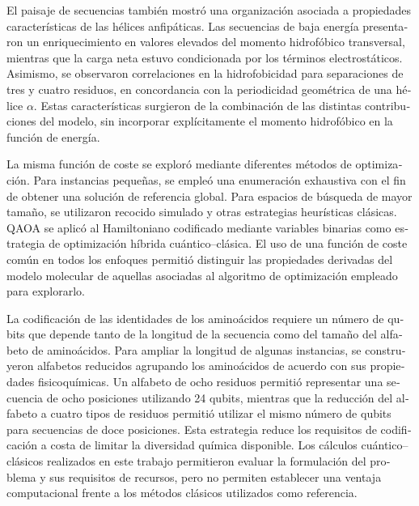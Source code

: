 \begin{otherlanguage}{spanish}
El paisaje de secuencias también mostró una organización asociada a propiedades características de las hélices anfipáticas. Las secuencias de baja energía presentaron un enriquecimiento en valores elevados del momento hidrofóbico transversal, mientras que la carga neta estuvo condicionada por los términos electrostáticos. Asimismo, se observaron correlaciones en la hidrofobicidad para separaciones de tres y cuatro residuos, en concordancia con la periodicidad geométrica de una hélice $\alpha$. Estas características surgieron de la combinación de las distintas contribuciones del modelo, sin incorporar explícitamente el momento hidrofóbico en la función de energía.

La misma función de coste se exploró mediante diferentes métodos de optimización. Para instancias pequeñas, se empleó una enumeración exhaustiva con el fin de obtener una solución de referencia global. Para espacios de búsqueda de mayor tamaño, se utilizaron recocido simulado y otras estrategias heurísticas clásicas. QAOA se aplicó al Hamiltoniano codificado mediante variables binarias como estrategia de optimización híbrida cuántico--clásica. El uso de una función de coste común en todos los enfoques permitió distinguir las propiedades derivadas del modelo molecular de aquellas asociadas al algoritmo de optimización empleado para explorarlo.


La codificación de las identidades de los aminoácidos requiere un número de qubits que depende tanto de la longitud de la secuencia como del tamaño del alfabeto de aminoácidos. Para ampliar la longitud de algunas instancias, se construyeron alfabetos reducidos agrupando los aminoácidos de acuerdo con sus propiedades fisicoquímicas. Un alfabeto de ocho residuos permitió representar una secuencia de ocho posiciones utilizando 24 qubits, mientras que la reducción del alfabeto a cuatro tipos de residuos permitió utilizar el mismo número de qubits para secuencias de doce posiciones. Esta estrategia reduce los requisitos de codificación a costa de limitar la diversidad química disponible. Los cálculos cuántico--clásicos realizados en este trabajo permitieron evaluar la formulación del problema y sus requisitos de recursos, pero no permiten establecer una ventaja computacional frente a los métodos clásicos utilizados como referencia.


\end{otherlanguage}
